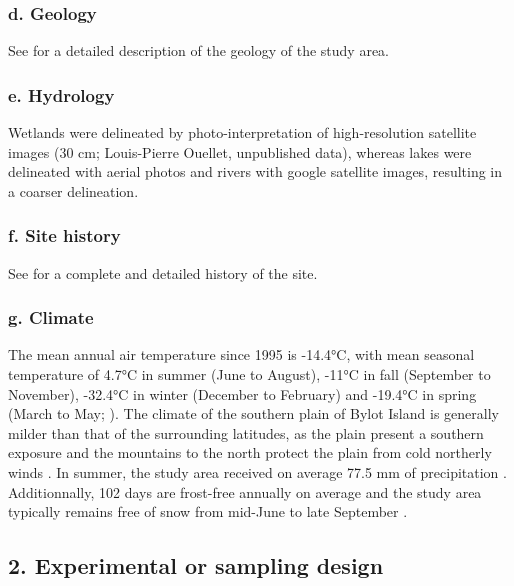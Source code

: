 \documentclass[a4paper,twoside,12pt]{article}
\begin{document}
                \subsubsection*{d. Geology} See \citet{klassen1993} for a detailed description of the geology of the study area.
                \subsubsection*{e. Hydrology} Wetlands were delineated by photo-interpretation of high-resolution satellite images (30 cm; Louis-Pierre Ouellet, unpublished data), whereas lakes were delineated with aerial photos and rivers with google satellite images, resulting in a coarser delineation.
                \subsubsection*{f. Site history} See \citet{gauthier2024a, gauthier2024b}  for a complete and detailed history of the site.
                \subsubsection*{g. Climate} The mean annual air temperature since 1995 is -14.4°C, with mean seasonal temperature of 4.7°C in summer (June to August), -11°C in fall (September to November), -32.4°C in winter (December to February) and -19.4°C in spring (March to May; \citet{bylotclimate}). The climate of the southern plain of Bylot Island is generally milder than that of the surrounding latitudes, as the plain present a southern exposure and the mountains to the north protect the plain from cold northerly winds \citep{gauthier2024a}. In summer, the study area received on average 77.5 mm of precipitation \citep{bylotclimate}. Additionnally, 102 days are frost-free annually on average  \citep{bylotclimate} and the study area typically remains free of snow from mid-June to late September \citep{gauthier2013}.
\newpage
       
        \subsection*{2. Experimental or sampling design}
\end{document}
